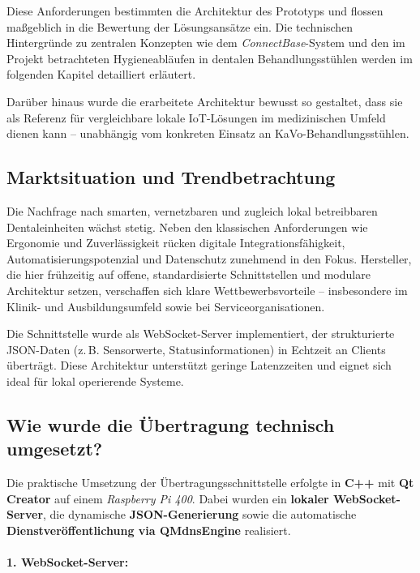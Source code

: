Diese Anforderungen bestimmten die Architektur des Prototyps und flossen maßgeblich in die Bewertung der Lösungsansätze ein. Die technischen Hintergründe zu zentralen Konzepten wie dem \textit{ConnectBase}-System und den im Projekt betrachteten Hygieneabläufen in dentalen Behandlungsstühlen werden im folgenden Kapitel detailliert erläutert.

Darüber hinaus wurde die erarbeitete Architektur bewusst so gestaltet, dass sie als Referenz für vergleichbare lokale IoT-Lösungen im medizinischen Umfeld dienen kann – unabhängig vom konkreten Einsatz an KaVo-Behandlungsstühlen.

\subsection{Marktsituation und Trendbetrachtung}

Die Nachfrage nach smarten, vernetzbaren und zugleich lokal betreibbaren Dentaleinheiten wächst stetig. Neben den klassischen Anforderungen wie Ergonomie und Zuverlässigkeit rücken digitale Integrationsfähigkeit, Automatisierungspotenzial und Datenschutz zunehmend in den Fokus. Hersteller, die hier frühzeitig auf offene, standardisierte Schnittstellen und modulare Architektur setzen, verschaffen sich klare Wettbewerbsvorteile – insbesondere im Klinik- und Ausbildungsumfeld sowie bei Serviceorganisationen.


Die Schnittstelle wurde als WebSocket-Server implementiert, der strukturierte JSON-Daten (z.\,B. Sensorwerte, Statusinformationen) in Echtzeit an Clients überträgt. Diese Architektur unterstützt geringe Latenzzeiten und eignet sich ideal für lokal operierende Systeme.


\subsection{Wie wurde die Übertragung technisch umgesetzt?}

Die praktische Umsetzung der Übertragungsschnittstelle erfolgte in \textbf{C++} mit \textbf{Qt Creator} auf einem \textit{Raspberry Pi 400}. Dabei wurden ein \textbf{lokaler WebSocket-Server}, die dynamische \textbf{JSON-Generierung} sowie die automatische \textbf{Dienstveröffentlichung via QMdnsEngine} realisiert. 

\vspace{1em}
\paragraph{1. WebSocket-Server:} 

